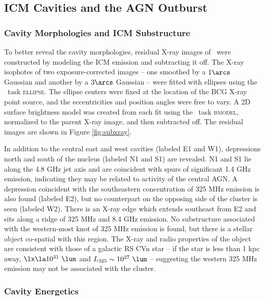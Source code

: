 \documentclass[11pt, preprint]{aastex}
\begin{document}
\subsection{ICM Cavities and the AGN Outburst}
\label{sec:cavities}

\subsubsection{Cavity Morphologies and ICM Substructure}

To better reveal the cavity morphologies, residual X-ray images of
\rbs\ were constructed by modeling the ICM emission and subtracting it
off. The X-ray isophotes of two exposure-corrected images -- one
smoothed by a $1\arcs$ Gaussian and another by a $3\arcs$ Gaussian --
were fitted with ellipses using the \iraf\ task \textsc{ellipse}. The
ellipse centers were fixed at the location of the BCG X-ray point
source, and the eccentricities and position angles were free to
vary. A 2D surface brightness model was created from each fit using
the \iraf\ task \textsc{bmodel}, normalized to the parent X-ray image,
and then subtracted off. The residual images are shown in Figure
\ref{fig:subxray}.

In addition to the central east and west cavities (labeled E1 and W1),
depressions north and south of the nucleus (labeled N1 and S1) are
revealed. N1 and S1 lie along the 4.8 GHz jet axis and are coincident
with spurs of significant 1.4 GHz emission, indicating they may be
related to activity of the central AGN. A depression coincident with
the southeastern concentration of 325 MHz emission is also found
(labeled E2), but no counterpart on the opposing side of the cluster
is seen (labeled W2). There is an X-ray edge which extends southeast
from E2 and sits along a ridge of 325 MHz and 8.4 GHz emission. No
substructure associated with the western-most knot of 325 MHz emission
is found, but there is a stellar object co-spatial with this region.
The X-ray and radio properties of the object are consistent with those
of a galactic RS CVn star \citep{1993RPPh...56.1145S} -- if the star
is less than 1 kpc away, $\lx \la 10^{31} ~\lum$ and $L_{325} \sim
10^{27} ~\lum$ -- suggesting the western 325 MHz emission may not be
associated with the cluster.

\subsubsection{Cavity Energetics}
\label{sec:ecav}
\end{document}
